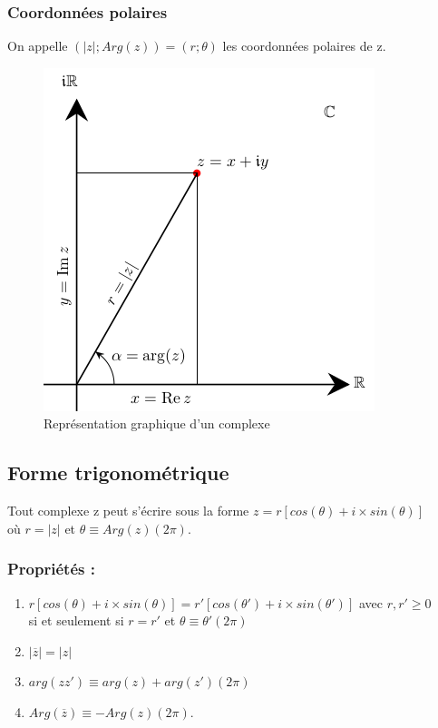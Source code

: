 \documentclass[a4paper,10pt]{book}
\begin{document}
\subsubsection{Coordonnées polaires}
On appelle $(|z|;Arg(z))=(r;\theta)$ les coordonnées polaires de z.\\
\begin{figure}[h] \begin{center}
\includegraphics[scale=0.4]{images/201.png}
\caption{Représentation graphique d'un complexe}
\end{center} \end{figure}

\subsection{Forme trigonométrique}

Tout complexe z peut s'écrire sous la forme $z=r[cos(\theta)+i\times sin(\theta)]$ \\où $r=|z|$ et $\theta \equiv Arg(z) (2\pi)$.\\

\subsubsection{Propriétés :}
\begin{enumerate} 
\item $r[cos(\theta)+i\times sin(\theta)]=r'[cos(\theta ')+i\times sin(\theta ')]$ avec $r,r' \geq 0$ \\
si et seulement si $r=r'$ et $\theta \equiv \theta '(2\pi)$
\item $|\overline{z}|=|z|$
\item $arg(zz')\equiv arg(z)+arg(z') (2\pi)$
\item $Arg(\overline{z}) \equiv -Arg(z) (2\pi)$.\end{enumerate}
\end{document}
